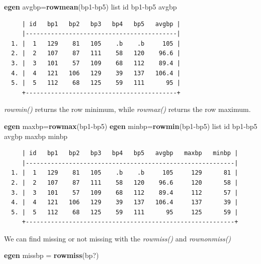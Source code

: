 \documentclass[
]{book}
\newenvironment{Shaded}{\begin{snugshade}}{\end{snugshade}}
\newcommand{\FunctionTok}[1]{\textcolor[rgb]{0.13,0.29,0.53}{\textbf{#1}}}
\newcommand{\KeywordTok}[1]{\textcolor[rgb]{0.13,0.29,0.53}{\textbf{#1}}}
\newcommand{\NormalTok}[1]{#1}
\newcommand{\OtherTok}[1]{\textcolor[rgb]{0.56,0.35,0.01}{#1}}
\begin{document}
\begin{Shaded}
\begin{Highlighting}[]
\KeywordTok{egen}\NormalTok{ avgbp=}\FunctionTok{rowmean}\NormalTok{(bp1{-}bp5)}
\OtherTok{list}\NormalTok{ id bp1{-}bp5 avgbp}
\end{Highlighting}
\end{Shaded}

\begin{verbatim}
     | id   bp1   bp2   bp3   bp4   bp5   avgbp |
     |------------------------------------------|
  1. |  1   129    81   105    .b    .b     105 |
  2. |  2   107    87   111    58   120    96.6 |
  3. |  3   101    57   109    68   112    89.4 |
  4. |  4   121   106   129    39   137   106.4 |
  5. |  5   112    68   125    59   111      95 |
     +------------------------------------------+
\end{verbatim}

\emph{rowmin()} returns the row minimum, while \emph{rowmax()} returns the row maximum.

\begin{Shaded}
\begin{Highlighting}[]
\KeywordTok{egen}\NormalTok{ maxbp=}\FunctionTok{rowmax}\NormalTok{(bp1{-}bp5)}
\KeywordTok{egen}\NormalTok{ minbp=}\FunctionTok{rowmin}\NormalTok{(bp1{-}bp5)}
\OtherTok{list}\NormalTok{ id bp1{-}bp5 avgbp maxbp minbp}
\end{Highlighting}
\end{Shaded}

\begin{verbatim}
     | id   bp1   bp2   bp3   bp4   bp5   avgbp   maxbp   minbp |
     |----------------------------------------------------------|
  1. |  1   129    81   105    .b    .b     105     129      81 |
  2. |  2   107    87   111    58   120    96.6     120      58 |
  3. |  3   101    57   109    68   112    89.4     112      57 |
  4. |  4   121   106   129    39   137   106.4     137      39 |
  5. |  5   112    68   125    59   111      95     125      59 |
     +----------------------------------------------------------+
\end{verbatim}

We can find missing or not missing with the \emph{rowmiss()} and \emph{rownonmiss()}

\begin{Shaded}
\begin{Highlighting}[]
    \KeywordTok{egen}\NormalTok{ missbp = }\FunctionTok{rowmiss}\NormalTok{(bp?)}
\end{Highlighting}
\end{Shaded}
\end{document}
